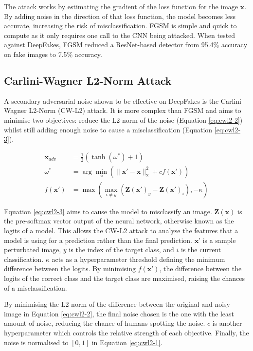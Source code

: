 The attack works by estimating the gradient of the loss function for the image $\textbf{x}$. By adding noise in the direction of that loss function, the model becomes less accurate, increasing the risk of misclassification. FGSM is simple and quick to compute as it only requires one call to the CNN being attacked. When tested against DeepFakes, FGSM reduced a ResNet-based detector from 95.4\% accuracy on fake images to 7.5\% accuracy\cite{gandhi2020adversarial}.

\subsection{Carlini-Wagner L2-Norm Attack}

A secondary adversarial noise shown to be effective on DeepFakes is the Carlini-Wagner L2-Norm (CW-L2) attack\cite{carlini2017towards}. It is more complex than FGSM and aims to minimise two objectives: reduce the L2-norm of the noise (Equation \ref{eq:cwl2-2}) whilst still adding enough noise to cause a misclassification (Equation \ref{eq:cwl2-3}).

\begin{align}
    \mathbf{x}_{adv} &= \frac{1}{2} \left( \tanh(\omega^*) + 1 \right) \label{eq:cwl2-1}\\
    \omega^* &= \arg\min_\omega \left( \|\mathbf{x'} - \mathbf{x}\|_2^2 + c f(\mathbf{x'}) \right) \label{eq:cwl2-2}\\
    f(\mathbf{x'}) &= \max\left( \max_{i \neq y} \left( \mathbf{Z}(\mathbf{x'})_y - \mathbf{Z}(\mathbf{x'})_i \right), -\kappa \right) \label{eq:cwl2-3}
\end{align}

Equation \ref{eq:cwl2-3} aims to cause the model to misclassify an image. $\mathbf{Z}(\textbf{x})$ is the pre-softmax vector output of the neural network, otherwise known as the logits of a model. This allows the CW-L2 attack to analyse the features that a model is using for a prediction rather than the final prediction. $\textbf{x'}$ is a sample perturbated image, $y$ is the index of the target class, and $i$ is the current classification. $\kappa$ acts as a hyperparameter threshold defining the minimum difference between the logits. By minimising $f(\textbf{x'})$, the difference between the logits of the correct class and the target class are maximised, raising the chances of a misclassification.

By minimising the L2-norm of the difference between the original and noisy image in Equation \ref{eq:cwl2-2}, the final noise chosen is the one with the least amount of noise, reducing the chance of humans spotting the noise. $c$ is another hyperparameter which controls the relative strength of each objective. Finally, the noise is normalised to $[0,1]$ in Equation \ref{eq:cwl2-1}.

